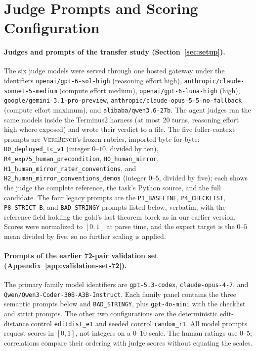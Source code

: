 \section{Judge Prompts and Scoring Configuration}\label{app:judge-prompts}
\paragraph{Judges and prompts of the transfer study (Section~\ref{sec:setup}).}
The six judge models were served through one hosted gateway under the identifiers \texttt{openai/gpt-6-sol-high} (reasoning effort high), \texttt{anthropic/claude-sonnet-5-medium} (compute effort medium), \texttt{openai/gpt-6-luna-high} (high), \texttt{google/gemini-3.1-pro-preview}, \texttt{anthropic/claude-opus-5-5-no-fallback} (compute effort maximum), and \texttt{alibaba/qwen3.6-27b}.
The agent judges ran the same models inside the Terminus2 harness (at most 20 turns, reasoning effort high where exposed) and wrote their verdict to a file.
The five fuller-context prompts are \textsc{VeriBench}'s frozen rubrics, imported byte-for-byte: \texttt{D0\_deployed\_tc\_v1} (integer $0$--$10$, divided by ten), \texttt{R4\_exp75\_human\_precondition}, \texttt{H0\_human\_mirror}, \texttt{H1\_human\_mirror\_rater\_conventions}, and \texttt{H2\_human\_mirror\_conventions\_demos} (integer $0$--$5$, divided by five); each shows the judge the complete reference, the task's Python source, and the full candidate.
The four legacy prompts are the \texttt{P1\_BASELINE}, \texttt{P4\_CHECKLIST}, \texttt{P8\_STRICT\_B}, and \texttt{BAD\_STRINGY} prompts listed below, verbatim, with the reference field holding the gold's last theorem block as in our earlier version.
Scores were normalized to $[0,1]$ at parse time, and the expert target is the $0$--$5$ mean divided by five, so no further scaling is applied.

\paragraph{Prompts of the earlier 72-pair validation set (Appendix~\ref{app:validation-set-72}).}
The primary family model identifiers are \texttt{gpt-5.3-codex}, \texttt{claude-opus-4-7}, and \texttt{Qwen/Qwen3-Coder-30B-A3B-Instruct}.
Each family panel contains the three semantic prompts below and \texttt{BAD\_STRINGY}, plus \texttt{gpt-4o-mini} with the checklist and strict prompts.
The other two configurations are the deterministic edit-distance control \texttt{editdist\_e1} and seeded control \texttt{random\_r1}.
All model prompts request scores in $[0,1]$, not integers on a $0$--$10$ scale.
The human ratings use $0$--$5$; correlations compare their ordering with judge scores without equating the scales.

